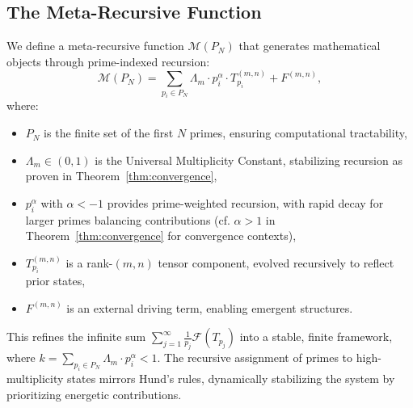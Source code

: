 \documentclass{article}
\theoremstyle{plain}
\begin{document}
\subsection{The Meta-Recursive Function}
We define a meta-recursive function \(\mathcal{M}(P_N)\) that generates mathematical objects through prime-indexed recursion:
\begin{equation}
    \mathcal{M}(P_N) = \sum_{p_i \in P_N} \Lambda_m \cdot p_i^\alpha \cdot T_{p_i}^{(m,n)} + F^{(m,n)},
\end{equation}
where:
\begin{itemize}
    \item \(P_N\) is the finite set of the first \(N\) primes, ensuring computational tractability,
    \item \(\Lambda_m \in (0, 1)\) is the Universal Multiplicity Constant, stabilizing recursion as proven in Theorem~\ref{thm:convergence},
    \item \(p_i^\alpha\) with \(\alpha < -1\) provides prime-weighted recursion, with rapid decay for larger primes balancing contributions (cf. \(\alpha > 1\) in Theorem~\ref{thm:convergence} for convergence contexts),
    \item \(T_{p_i}^{(m,n)}\) is a rank-$(m,n)$ tensor component, evolved recursively to reflect prior states,
    \item \(F^{(m,n)}\) is an external driving term, enabling emergent structures.
\end{itemize}
This refines the infinite sum \(\sum_{j=1}^\infty \frac{1}{p_j} \mathcal{F}(T_{p_j})\) into a stable, finite framework, where \(k = \sum_{p_i \in P_N} \Lambda_m \cdot p_i^\alpha < 1\). The recursive assignment of primes to high-multiplicity states mirrors Hund’s rules, dynamically stabilizing the system by prioritizing energetic contributions.
\end{document}
